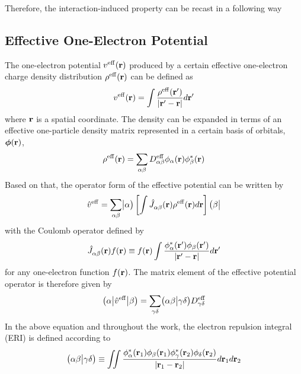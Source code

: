 Therefore, the interaction\hyp{}induced property can be recast in a following way


\subsection{\label{ss:2.2}Effective One-Electron Potential}

The one\hyp{}electron potential $v^{\rm eff}({\bf r})$
produced by a certain effective one\hyp{}electron charge density distribution $\rho^{\rm eff}({\bf r})$
can be defined as
%
\begin{equation}
	v^{\rm eff}({\bf r}) = \int \frac{ \rho^{\rm eff}({\bf r}') }{ \vert {\bf r}' - {\bf r} \vert} d{\bf r}'
\end{equation}
%
where ${\bf r}$ is a spatial coordinate. The density can be expanded in terms of an effective
one\hyp{}particle density matrix represented in a certain basis of orbitals, $\bm{\phi}({\bf r})$,
%
\begin{equation}
	\rho^{\rm eff}({\bf r}) = \sum_{\alpha\beta} D_{\alpha\beta}^{\rm eff} 
	\phi_\alpha({\bf r}) \phi_\beta^{*}({\bf r})
\end{equation}
%
Based on that, the operator form of the effective potential 
can be written by
%
\begin{equation}
	\hat{v}^{\rm eff} = \sum_{\alpha\beta} 
	\bigr\rvert {\alpha} \bigr) 
	\left[
	\int
	\hat{J}^{\rm}_{\alpha\beta}({\bf r}) 
	\rho^{\rm eff}({\bf r})
	d{\bf r} 
	\right]
	\bigl( {\beta} \bigl\lvert
\end{equation}
%
with the Coulomb operator defined by
%
\begin{equation}
	\hat{J}^{\rm}_{\alpha\beta}({\bf r}) f({\bf r}) \equiv
	f({\bf r}) 
	\int
	\frac{ \phi_\alpha^{*}({\bf r}') \phi_\beta({\bf r}') }{ \vert {\bf r}' - {\bf r} \vert} d{\bf r}'
\end{equation}
%
for any one\hyp{}electron function $f({\bf r})$. The matrix element of the effective potential operator
is therefore given by
%
\begin{equation}
	\bigl( {\alpha} \bigl\lvert { \hat{v}^{\rm eff} } \bigl\lvert {\beta} \bigr)
	= \sum_{\gamma\delta} \bigl( {\alpha\beta} \bigl\lvert {\gamma\delta} \bigr) D^{\rm eff}_{\gamma\delta}
\end{equation}
%
In the above equation and throughout the work, the electron repulsion integral (ERI)
is defined according to
%
\begin{equation}
	\bigl( {\alpha\beta} \bigl\lvert {\gamma\delta} \bigr) \equiv
	\iint 
	\frac{ \phi_\alpha^{*}({\bf r}_1) \phi_\beta({\bf r}_1) 
	       \phi_\gamma^{*}({\bf r}_2) \phi_\delta({\bf r}_2) }{ \vert {\bf r}_1 - {\bf r}_2 \vert}
	d{\bf r}_1 d{\bf r}_2
\end{equation}
%

